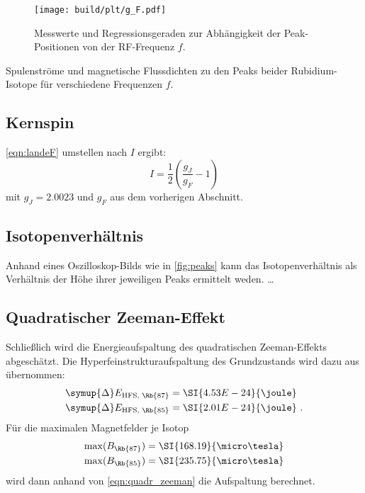 \begin{figure}
    \centering
    \texttt{[image: build/plt/g\_F.pdf]}
    \caption{Messwerte und Regressionsgeraden zur Abhängigkeit der Peak-Positionen von der RF-Frequenz $f$.}
    \label{fig:plt:g_F}
\end{figure}

\begin{table}
    \centering
    \caption{Spulenströme und magnetische Flussdichten zu den Peaks beider Rubidium-Isotope für verschiedene Frequenzen $f$.}
    \label{tab:mess}
\end{table}



\subsection{Kernspin}


\autoref{eqn:landeF} umstellen nach $I$ ergibt:
\[
    I = \frac{1}{2} \left( \frac{g_J}{g_F} - 1 \right)
\]
mit $g_J = \num{2.0023}$ und $g_F$ aus dem vorherigen Abschnitt.


\subsection{Isotopenverhältnis}
Anhand eines Oszilloskop-Bilds wie in \autoref{fig:peaks} kann das Isotopenverhältnis
als Verhältnis der Höhe ihrer jeweiligen Peaks ermittelt weden.
…


\subsection{Quadratischer Zeeman-Effekt}
Schließlich wird die Energieaufspaltung des quadratischen Zeeman-Effekts abgeschätzt.
Die Hyperfeinstrukturaufspaltung des Grundzustands wird dazu aus \cite{versuchsanleitung} übernommen:
\begin{align*}
    \symup{\Delta}E_\text{HFS, \Rb{87}} &= \SI{4.53E-24}{\joule} \\
    \symup{\Delta}E_\text{HFS, \Rb{85}} &= \SI{2.01E-24}{\joule} \ .
\end{align*}
Für die maximalen Magnetfelder je Isotop
\begin{align*}
    \max(B_{\Rb{87}}) &= \SI{168.19}{\micro\tesla} \\
    \max(B_{\Rb{85}}) &= \SI{235.75}{\micro\tesla} \\
\end{align*}
wird dann anhand von \autoref{eqn:quadr_zeeman} die Aufspaltung berechnet.

